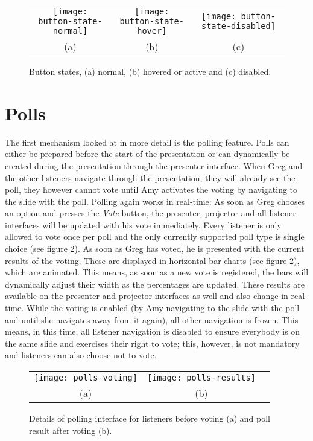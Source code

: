 \begin{figure}
\centering
\begin{tabular}{ccc}
\texttt{[image: button-state-normal]} &
\texttt{[image: button-state-hover]} &
\texttt{[image: button-state-disabled]} \\
(a) & (b) & (c)
\end{tabular}
\caption{Button states, (a) normal, (b) hovered or active and (c) disabled.}
\label{fig:design-interface-button}
\end{figure}

\section{Polls}
The first mechanism looked at in more detail is the polling feature. Polls can either be prepared before the start of the presentation or can dynamically be created during the presentation through the presenter interface. When Greg and the other listeners navigate through the presentation, they will already see the poll, they however cannot vote until Amy activates the voting by navigating to the slide with the poll. Polling again works in real-time: As soon as Greg chooses an option and presses the \emph{Vote} button, the presenter, projector and all listener interfaces will be updated with his vote immediately. Every listener is only allowed to vote once per poll and the only currently supported poll type is single choice (see figure \ref{fig:design-polls}). As soon as Greg has voted, he is presented with the current results of the voting. These are displayed in horizontal bar charts (see figure \ref{fig:design-polls}), which are animated. This means, as soon as a new vote is registered, the bars will dynamically adjust their width as the percentages are updated. These results are available on the presenter and projector interfaces as well and also change in real-time.
While the voting is enabled (by Amy navigating to the slide with the poll and until she navigates away from it again), all other navigation is frozen. This means, in this time, all listener navigation is disabled to ensure everybody is on the same slide and exercises their right to vote; this, however, is not mandatory and listeners can also choose not to vote.

\begin{figure}
\centering
\begin{tabular}{ccc}
\texttt{[image: polls-voting]} &
\texttt{[image: polls-results]} \\
(a) & (b)
\end{tabular}
\caption{Details of polling interface for listeners before voting (a) and poll result after voting (b).}
\label{fig:design-polls}
\end{figure}

